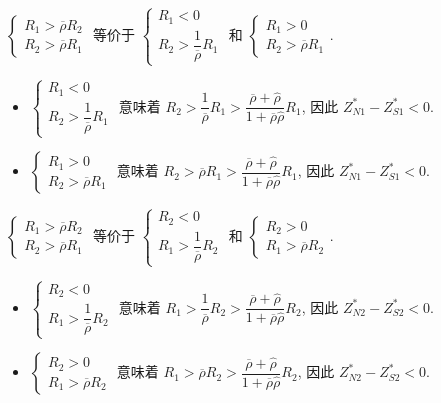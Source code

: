 \documentclass[10.0pt]{article}
\begin{document}
$ \left\{ \begin{matrix} R_1 > \overline{\rho} R_2 \\ R_2 > \overline{\rho} R_1 \end{matrix} \right. $ 等价于 $ \left\{ \begin{matrix} R_1 < 0 \\ R_2 > \dfrac{1}{\overline{\rho}} R_1 \end{matrix} \right. $ 和 $ \left\{ \begin{matrix} R_1 > 0 \\ R_2 > \overline{\rho} R_1 \end{matrix} \right. $. 
\begin{itemize}
\item $ \left\{ \begin{matrix} R_1 < 0 \\ R_2 > \dfrac{1}{\overline{\rho}} R_1 \end{matrix} \right. $ 意味着 $ R_2 > \dfrac{1}{\overline{\rho}} R_1 > \dfrac{\overline{\rho} + {\hat \rho}}{1 + \overline{\rho} {\hat \rho}} R_1 $, 因此 $ Z_{N 1}^* - Z_{S 1}^* < 0 $.
\item $ \left\{ \begin{matrix} R_1 > 0 \\ R_2 > \overline{\rho} R_1 \end{matrix} \right. $ 意味着 $ R_2 > \overline{\rho} R_1 > \dfrac{\overline{\rho} + {\hat \rho}}{1 + \overline{\rho} {\hat \rho}} R_1 $, 因此 $ Z_{N 1}^* - Z_{S 1}^* < 0 $.
\end{itemize}

$ \left\{ \begin{matrix} R_1 > \overline{\rho} R_2 \\ R_2 > \overline{\rho} R_1 \end{matrix} \right. $ 等价于 $ \left\{ \begin{matrix} R_2 < 0 \\ R_1 > \dfrac{1}{\overline{\rho}} R_2 \end{matrix} \right. $ 和 $ \left\{ \begin{matrix} R_2 > 0 \\ R_1 > \overline{\rho} R_2 \end{matrix} \right. $. 
\begin{itemize}
\item $ \left\{ \begin{matrix} R_2 < 0 \\ R_1 > \dfrac{1}{\overline{\rho}} R_2 \end{matrix} \right. $ 意味着 $ R_1 > \dfrac{1}{\overline{\rho}} R_2 > \dfrac{\overline{\rho} + {\hat \rho}}{1 + \overline{\rho} {\hat \rho}} R_2 $, 因此 $ Z_{N 2}^* - Z_{S 2}^* < 0 $.
\item $ \left\{ \begin{matrix} R_2 > 0 \\ R_1 > \overline{\rho} R_2 \end{matrix} \right. $ 意味着 $ R_1 > \overline{\rho} R_2 > \dfrac{\overline{\rho} + {\hat \rho}}{1 + \overline{\rho} {\hat \rho}} R_2 $, 因此 $ Z_{N 2}^* - Z_{S 2}^* < 0 $.
\end{itemize}
\end{document}
